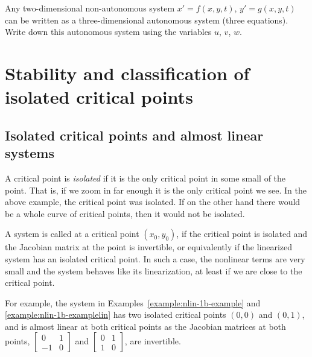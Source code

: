 \begin{exercise}
Any two-dimensional non-autonomous system $x'=f(x,y,t)$, $y'=g(x,y,t)$ can
be written as a three-dimensional autonomous system (three equations).  Write down this
autonomous system using the variables $u$, $v$, $w$.
\end{exercise}


\sectionnewpage
\section{Stability and classification of isolated critical points}
\label{nlinstability:section}


\subsection{Isolated critical points and almost linear systems}

A critical point is
\emph{isolated}
if it is the only critical point in some small
 of the point.  That is, if we zoom in far enough it is the
only critical point we see.  In the above example, the critical point was
isolated.  If on the other hand there would be a whole curve of critical
points, then it would not be isolated.

A system is called \emph{} at a critical point
$(x_0,y_0)$, if the critical point is isolated and the Jacobian matrix at the point
is invertible, or equivalently if the linearized system has an isolated
critical point.  In such a case, the nonlinear terms are very small
and the system behaves like its linearization, at least if we are close
to the critical point.

For example, the system in
Examples~\ref{example:nlin-1b-example} and \ref{example:nlin-1b-examplelin}
has two isolated critical points $(0,0)$ and $(0,1)$, and
is almost linear at both critical points as 
the Jacobian matrices at both points,
$\left[ \begin{smallmatrix} 0 & 1 \\ -1 & 0 \end{smallmatrix} \right]$ and
$\left[ \begin{smallmatrix} 0 & 1 \\ 1 & 0 \end{smallmatrix} \right]$,
are invertible.

